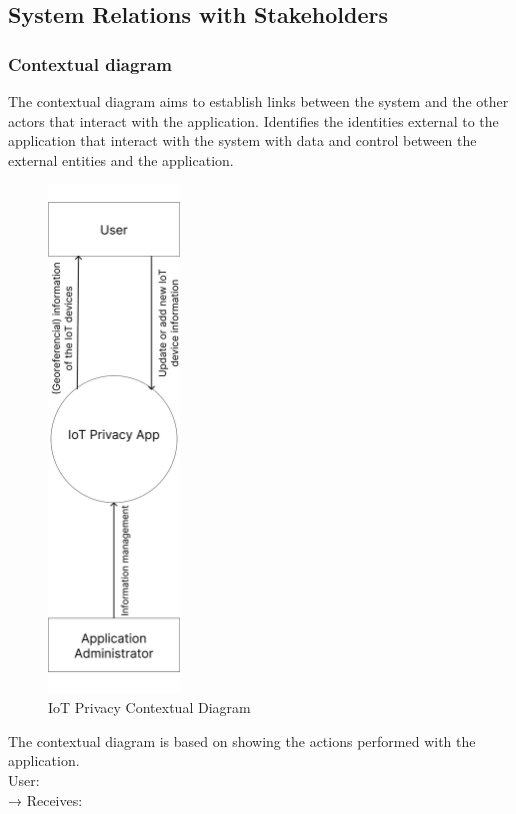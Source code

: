 \subsection*{System Relations with Stakeholders}

\subsubsection*{Contextual diagram}

The contextual diagram aims to establish links between the system
and the other actors that interact with the application.
\newline
Identifies the identities external to the application that interact with
the system with data and control between the external entities and the application.
\begin{figure}[H]
    \centering
    \includegraphics[width=3.5cm]{../app/docs/software_requirements/assets/images/contextual_diagram.png}
    \caption{IoT Privacy Contextual Diagram}
    \label{fig:contextual diagram}
\end{figure}
The contextual diagram is based on showing the actions performed with the
application. \\
\newline
User: \\
\newline
→ Receives:

